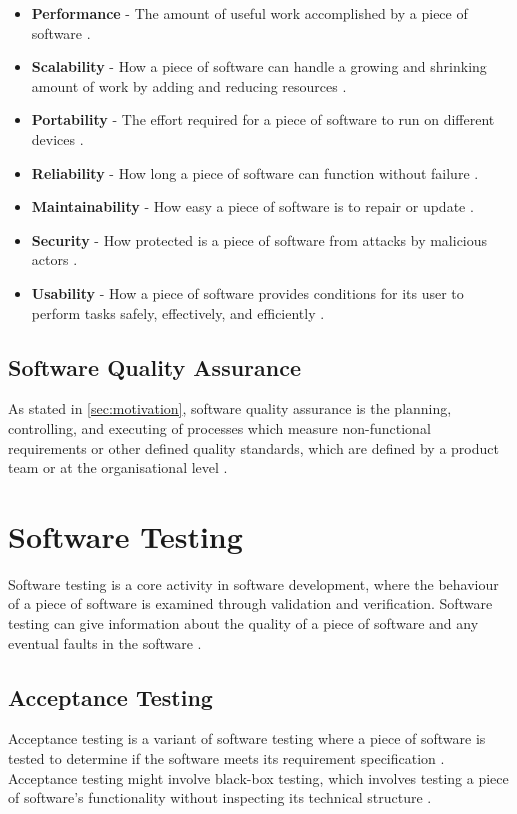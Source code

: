 \begin{itemize}
    \item \textbf{Performance} - The amount of useful work accomplished by a piece of software \cite{performance_wiki_2023}.
    \item \textbf{Scalability} - How a piece of software can handle a growing and shrinking amount of work by adding and reducing resources \cite{scalability_wiki_2023}. 
    \item \textbf{Portability} - The effort required for a piece of software to run on different devices \cite{portability_wiki_2023}.
    \item \textbf{Reliability} - How long a piece of software can function without failure \cite{reliability_wiki_2023}.
    \item \textbf{Maintainability} - How easy a piece of software is to repair or update \cite{maintainability_wiki_2023}. 
    \item \textbf{Security} - How protected is a piece of software from attacks by malicious actors \cite{security_wiki_2023}.
    \item \textbf{Usability} - How a piece of software provides conditions for its user to perform tasks safely, effectively, and efficiently \cite{usability_wiki_2023}.
\end{itemize}

\subsection{Software Quality Assurance}
As stated in \autoref{sec:motivation}, software quality assurance is the planning, controlling, and executing of processes which measure non-functional requirements or other defined quality standards, which are defined by a product team or at the organisational level \cite{ieee_730_2014}\cite{sqa_wiki_2023}.

\section{Software Testing}
Software testing is a core activity in software development, where the behaviour of a piece of software is examined through validation and verification. Software testing can give information about the quality of a piece of software and any eventual faults in the software \cite{software_testing_wiki_2023}.

\subsection{Acceptance Testing}
Acceptance testing is a variant of software testing where a piece of software is tested to determine if the software meets its requirement specification \cite{acceptance_testing_wiki_2023}. Acceptance testing might involve black-box testing, which involves testing a piece of software's functionality without inspecting its technical structure \cite{black_box_testing_wiki_2023}.

